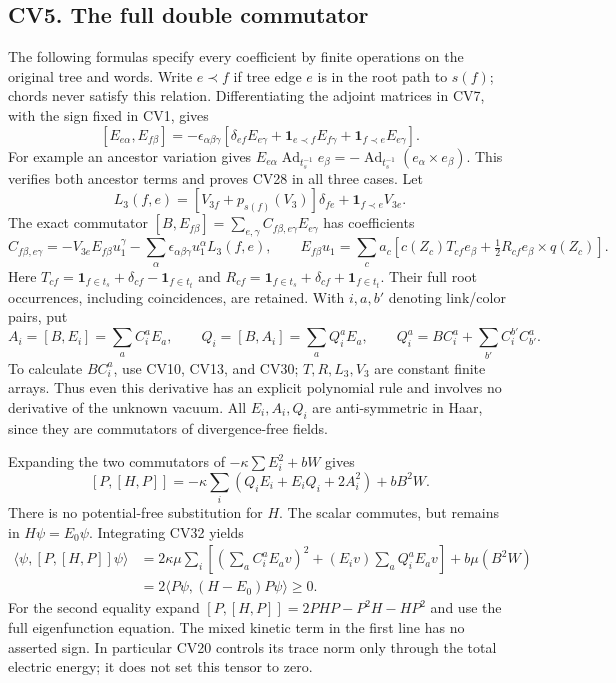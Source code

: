 \documentclass[11pt]{article}
\begin{document}
\subsection*{CV5. The full double commutator}

The following formulas specify every coefficient by finite operations
on the original tree and words. Write \(e\prec f\) if tree edge \(e\)
is in the root path to \(s(f)\); chords never satisfy this relation.
Differentiating the adjoint matrices in CV7, with the sign fixed in
CV1, gives
\[
 [E_{e\alpha},E_{f\beta}]
  =-\epsilon_{\alpha\beta\gamma}
  [\delta_{ef}E_{e\gamma}
      +\mathbf1_{e\prec f}E_{f\gamma}
      +\mathbf1_{f\prec e}E_{e\gamma}].                  \tag{CV28}
\]
For example an ancestor variation gives
\(E_{e\alpha}\operatorname{Ad}_{t_s^{-1}}e_\beta
=-\operatorname{Ad}_{t_s^{-1}}(e_\alpha\times e_\beta)\).
This verifies both ancestor terms and proves CV28 in all three cases.
Let
\[
 L_3(f,e)=[V_{3f}+p_{s(f)}(V_3)]\delta_{fe}
                              +\mathbf1_{f\prec e}V_{3e}.
                                                               \tag{CV29}
\]
The exact commutator \([B,E_{f\beta}]=\sum_{e,\gamma}
C_{f\beta,e\gamma}E_{e\gamma}\) has coefficients
\[
 C_{f\beta,e\gamma}
  =-V_{3e}E_{f\beta}u_1^\gamma
       -\sum_\alpha\epsilon_{\alpha\beta\gamma}
                    u_1^\alpha L_3(f,e),\qquad
 E_{f\beta}u_1
  =\sum_ca_c[c(Z_c)T_{cf}e_\beta
                         +\tfrac12R_{cf}e_\beta\times q(Z_c)].
                                                               \tag{CV30}
\]
Here \(T_{cf}=\mathbf1_{f\in t_s}+\delta_{cf}-\mathbf1_{f\in t_t}\)
and \(R_{cf}=\mathbf1_{f\in t_s}+\delta_{cf}+\mathbf1_{f\in t_t}\).
Their full root occurrences, including coincidences, are retained.
With \(i,a,b'\) denoting link/color pairs, put
\[
 A_i=[B,E_i]=\sum_aC_i^aE_a,\qquad
 Q_i=[B,A_i]=\sum_a Q_i^aE_a,\qquad
 Q_i^a=BC_i^a+\sum_{b'}C_i^{b'}C_{b'}^a.                \tag{CV31}
\]
To calculate \(BC_i^a\), use CV10, CV13, and CV30; \(T,R,L_3,V_3\)
are constant finite arrays. Thus even this derivative has an explicit
polynomial rule and involves no derivative of the unknown vacuum.
All \(E_i,A_i,Q_i\) are anti-symmetric in Haar, since they are
commutators of divergence-free fields.

Expanding the two commutators of \(-\kappa\sum E_i^2+bW\) gives
\[
 [P,[H,P]]
  =-\kappa\sum_i(Q_iE_i+E_iQ_i+2A_i^2)+bB^2W.           \tag{CV32}
\]
There is no potential-free substitution for \(H\). The scalar commutes,
but remains in \(H\psi=E_0\psi\). Integrating CV32 yields
\[
 \begin{aligned}
 \langle\psi,[P,[H,P]]\psi\rangle
 &=2\kappa\mu\sum_i
   \left[(\sum_aC_i^aE_av)^2
          +(E_iv)\sum_aQ_i^aE_av\right]+b\mu(B^2W)\\
 &=2\langle P\psi,(H-E_0)P\psi\rangle\ge0 .
 \end{aligned}                                                   \tag{CV33}
\]
For the second equality expand
\([P,[H,P]]=2PHP-P^2H-HP^2\) and use the full eigenfunction equation.
The mixed kinetic term in the first line has no asserted sign. In
particular CV20 controls its trace norm only through the total
electric energy; it does not set this tensor to zero.
\end{document}

